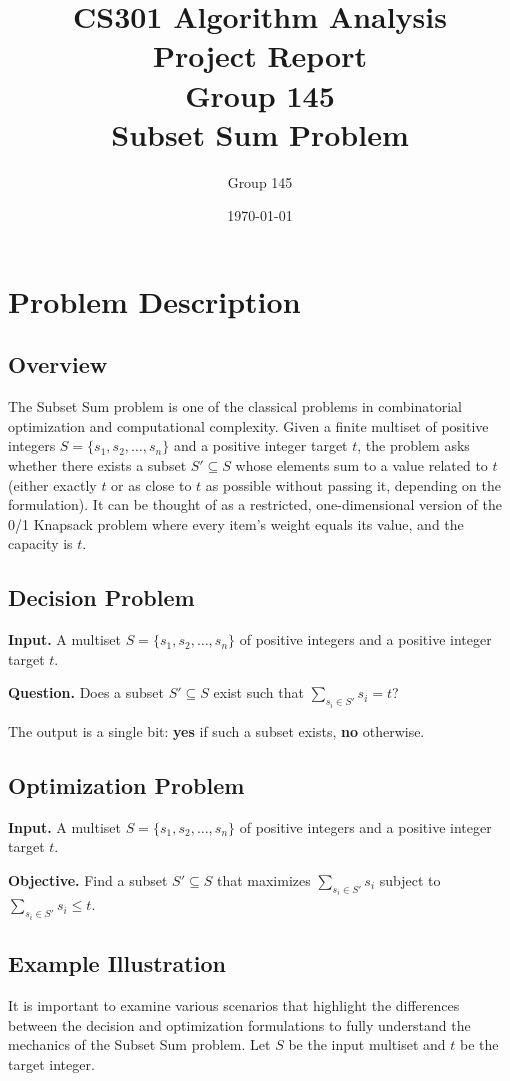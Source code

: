 \documentclass[12pt,a4paper]{article}
\title{CS301 Algorithm Analysis\\Project Report\\Group 145\\Subset Sum Problem}
\author{Group 145}
\date{\today}
\begin{document}
\maketitle

\tableofcontents
\newpage

\section{Problem Description}

\subsection{Overview}
The Subset Sum problem is one of the classical problems in combinatorial optimization and computational complexity. Given a finite multiset of positive integers $S = \{s_1, s_2, \ldots, s_n\}$ and a positive integer target $t$, the problem asks whether there exists a subset $S' \subseteq S$ whose elements sum to a value related to $t$ (either exactly $t$ or as close to $t$ as possible without passing it, depending on the formulation). It can be thought of as a restricted, one-dimensional version of the 0/1 Knapsack problem where every item's weight equals its value, and the capacity is $t$.

\subsection{Decision Problem}
\textbf{Input.} A multiset $S = \{s_1, s_2, \ldots, s_n\}$ of positive integers and a positive integer target $t$.

\textbf{Question.} Does a subset $S' \subseteq S$ exist such that $\sum_{s_i \in S'} s_i = t$?

The output is a single bit: \textbf{yes} if such a subset exists, \textbf{no} otherwise.

\subsection{Optimization Problem}
\textbf{Input.} A multiset $S = \{s_1, s_2, \ldots, s_n\}$ of positive integers and a positive integer target $t$.

\textbf{Objective.} Find a subset $S' \subseteq S$ that maximizes $\sum_{s_i \in S'} s_i$ subject to $\sum_{s_i \in S'} s_i \leq t$.

\subsection{Example Illustration}
It is important to examine various scenarios that highlight the differences between the decision and optimization formulations to fully understand the mechanics of the Subset Sum problem. Let $S$ be the input multiset and $t$ be the target integer.
\end{document}
